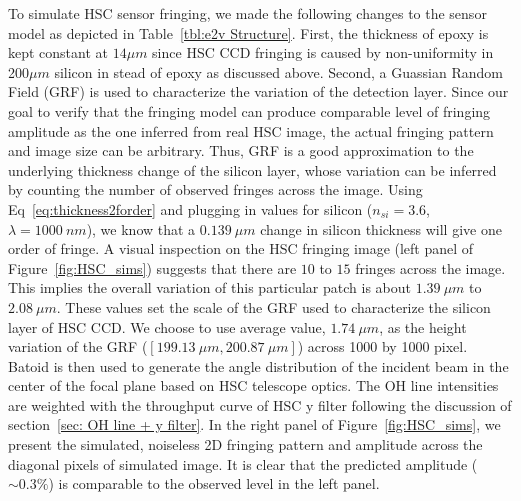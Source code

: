 \documentclass[twocolumn]{aastex63} %
\begin{document}
\begin{CJK*}{UTF8}{gbsn}
To simulate HSC sensor fringing, we made the following changes to the sensor model as depicted in Table~\ref{tbl:e2v Structure}. First, the thickness of epoxy is kept constant at $14\mu m$ since HSC CCD fringing is caused by non-uniformity in 200$\mu m$ silicon in stead of epoxy as discussed above. Second, a Guassian Random Field (GRF) is used to characterize the variation of the detection layer. Since our goal to verify that the fringing model can produce comparable level of fringing amplitude as the one inferred from real HSC image, the actual fringing pattern and image size can be arbitrary. Thus, GRF is a good approximation to the underlying thickness change of the silicon layer, whose variation can be inferred by counting the number of observed fringes across the image. Using Eq~\ref{eq:thickness2forder} and plugging in values for silicon ($n_{si} = 3.6$, $\lambda = 1000\ nm$), we know that a $0.139\ \mu m$ change in silicon thickness will give one order of fringe. A visual inspection on the HSC fringing image (left panel of Figure~\ref{fig:HSC_sims}) suggests that there are $10$ to $15$ fringes across the image. This implies the overall variation of this particular patch is about $1.39\ \mu m$ to $2.08\ \mu m$. These values set the scale of the GRF used to characterize the silicon layer of HSC CCD. We choose to use average value, $1.74\ \mu m$, as the height variation of the GRF ($[199.13\ \mu m, 200.87\ \mu m]$) across 1000 by 1000 pixel.
Batoid is then used to generate the angle distribution of the incident beam in the center of the focal plane based on HSC telescope optics. The OH line intensities are weighted with the throughput curve of HSC y filter following the discussion of section~\ref{sec: OH line + y filter}. In the right panel of Figure~\ref{fig:HSC_sims}, we present the simulated, noiseless 2D fringing pattern and amplitude across the diagonal pixels of simulated image. It is clear that the predicted  amplitude ($\sim 0.3\%$) is comparable to the observed level in the left panel.


\end{CJK*}
\end{document}
